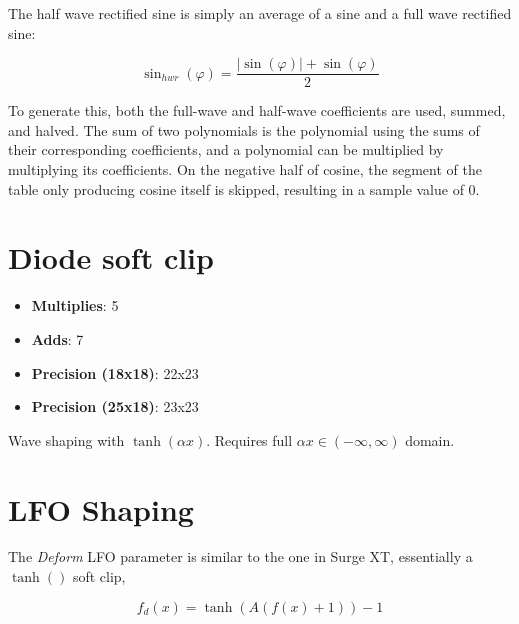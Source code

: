 The half wave rectified sine is simply an average of a sine and a full wave rectified sine:

\begin{equation*}
	\sin_{hwr}\left(\varphi\right)=\frac{\left|\sin\left(\varphi\right)\right|+\sin\left(\varphi\right)}{2}
\end{equation*}

To generate this, both the full-wave and half-wave coefficients are used, summed, and halved.  The sum of two polynomials is the polynomial using the sums of their corresponding coefficients, and a polynomial can be multiplied by multiplying its coefficients.  On the negative half of cosine, the segment of the table only producing cosine itself is skipped, resulting in a sample value of 0.

\section{Diode soft clip}

\begin{itemize}
	\item \textbf{Multiplies}:  5
	\item \textbf{Adds}: 7
	\item \textbf{Precision (18x18)}:  22x23
	\item \textbf{Precision (25x18)}:  23x23
\end{itemize}

Wave shaping with $\tanh(\alpha x)$.  Requires full $\alpha x\in(-\infty,\infty)$ domain.

\section{LFO Shaping}

The \textit{Deform} LFO parameter is similar to the one in Surge XT, essentially a $\tanh()$ soft clip,

\begin{equation*}
	f_d\left(x\right)=\tanh\left(A\left(f\left(x\right)+1\right)\right)-1
\end{equation*}

